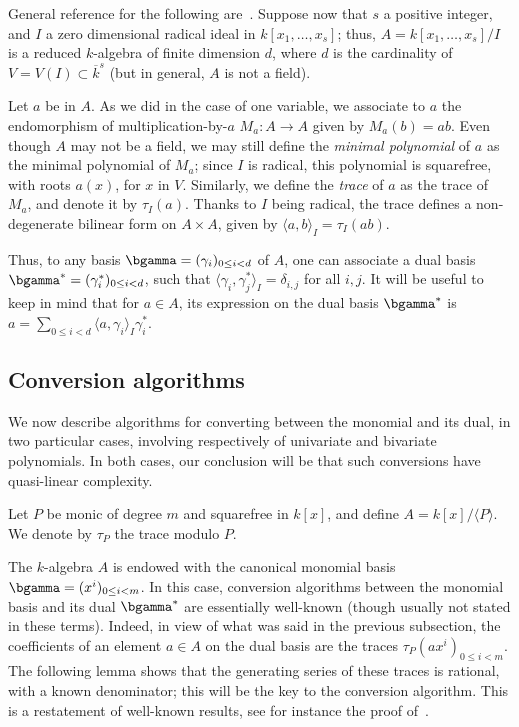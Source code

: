 \documentclass{sig-alternate}
\newcounter{algo}
\newcommand{\ang}[1]{\langle#1\rangle}
\begin{document}
General reference for the following
are~\cite{Kunz86,Cox-Little-OShea:UAG2005}. Suppose now that $s$ a
positive integer, and $I$ a zero dimensional radical ideal in
$k[x_1,\dots,x_s]$; thus, $A=k[x_1,\dots,x_s]/I$ is a reduced
$k$-algebra of finite dimension $d$, where $d$ is the cardinality of
$V=V(I) \subset\overline{k}^s$ (but in general, $A$ is not a field).

Let $a$ be in $A$. As we did in the case of one variable, we associate
to $a$ the endomorphism of multiplication-by-$a$ $M_a: A \to A$ given
by $M_a(b)=ab$.  Even though $A$ may not be a field, we may still
define the {\em minimal polynomial} of $a$ as the minimal polynomial
of $M_a$; since $I$ is radical, this polynomial is squarefree, with
roots $a(x)$, for $x$ in $V$. Similarly, we define the \emph{trace} of
$a$ as the trace of $M_a$, and denote it by $\tau_I(a)$. Thanks to $I$
being radical, the trace defines a non-degenerate bilinear form on
$A\times A$, given by $\ang{a,b}_I = \tau_I(ab)$.

Thus, to any basis $\bgamma=(\gamma_i)_{0 \le i < d}$ of $A$, one can
associate a dual basis $\bgamma^\ast=(\gamma^\ast_i)_{0 \le i < d}$,
such that $\ang{\gamma_i, \gamma^\ast_j}_I=\delta_{i,j}$ for all
$i,j$.  It will be useful to keep in mind that for $a \in A$, its
expression on the dual basis $\bgamma^\ast$ is $a=\sum_{0 \le i < d}
\ang{a,\gamma_i}_I \gamma^\ast_i$.



\subsection{Conversion algorithms} \label{ssec:conversions}
\label{sec:trace-formulas}

We now describe algorithms for converting between the monomial and its
dual, in two particular cases, involving respectively of univariate
and bivariate polynomials. In both cases, our conclusion will be that
such conversions have quasi-linear complexity.

\smallskip{} 
Let $P$ be monic of degree $m$ and squarefree in $k[x]$, and define
$A=k[x]/\ang{P}$. We denote by $\tau_P$ the trace modulo $P$.

The $k$-algebra $A$ is endowed with the canonical monomial basis
$\bgamma=(x^i)_{0 \le i < m}$.  In this case, conversion algorithms
between the monomial basis and its dual $\bgamma^\ast$ are essentially
well-known (though usually not stated in these terms). Indeed, in view
of what was said in the previous subsection, the coefficients of an
element $a \in A$ on the dual basis are the traces $\tau_P(ax^i)_{0
  \le i < m}$.  The following lemma shows that the generating series
of these traces is rational, with a known denominator; this will be
the key to the conversion algorithm. This is a restatement of
well-known results, see for instance the proof
of~\cite[Theorem~3.1]{rouiller99}.
\end{document}
